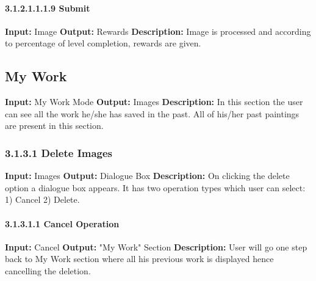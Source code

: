 \documentclass{scrreprt}
\begin{document}
\paragraph{3.1.2.1.1.1.9 Submit}
\hfill \vspace{2.5mm} \break 
\textbf{Input:} Image \newline
\textbf{Output:} Rewards
\vspace{1mm}\newline
\textbf{Description:} \newline 
Image is processed and according to percentage of level completion, rewards are given.

\subsection{My Work}
\textbf{Input:} My Work Mode \newline
\textbf{Output:} Images
\vspace{1mm}\newline
\textbf{Description:} \newline 
In this section the user can see all the work he/she has saved in the past. All of his/her past paintings are present in this section. 

\subsubsection{3.1.3.1 Delete Images}
\textbf{Input:} Images \newline
\textbf{Output:} Dialogue Box
\vspace{1mm}\newline
\textbf{Description:} \newline 
On clicking the delete option a dialogue box appears. It has two operation types which user can select: 1) Cancel  2) Delete.

\paragraph{3.1.3.1.1 Cancel Operation}
\hfill \vspace{2.5mm} \break 
\textbf{Input:} Cancel \newline
\textbf{Output:} "My Work" Section
\vspace{1mm}\newline
\textbf{Description:} \newline 
User will go one step back to My Work section where all his previous work is displayed hence cancelling the deletion.
\end{document}
